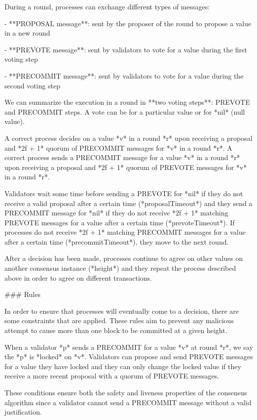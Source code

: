 \documentclass[a4paper,11pt,oneside]{report}
\begin{document}
\begin{markdown}
During a round, processes can exchange different types of messages:
 
- **PROPOSAL message**: sent by the proposer of the round to propose a value in a new round

- **PREVOTE message**: sent by validators to vote for a value during the first voting step

- **PRECOMMIT message**: sent by validators to vote for a value during the second voting step
 
We can summarize the execution in a round in **two voting steps**: PREVOTE and PRECOMMIT steps. A vote can be for a particular value or for *nil* (null value).

A correct process decides on a value *v* in a round *r* upon receiving a proposal and *2f + 1* quorum of PRECOMMIT messages for *v* in a round *r*. 
A correct process sends a PRECOMMIT message for a value *v* in a round *r* upon receiving a proposal and *2f + 1* quorum of PREVOTE messages for *v* in a round *r*.

Validators wait some time before sending a PREVOTE for *nil* if they do not receive a valid proposal after a certain time (*proposalTimeout*) and they send a PRECOMMIT message for *nil* if they do not receive *2f + 1* matching PREVOTE messages for a value after a certain time (*prevoteTimeout*).
If processes do not receive *2f + 1* matching PRECOMMIT messages for a value after a certain time (*precommitTimeout*), they move to the next round.

After a decision has been made, processes continue to agree on other values on another consensus instance (*height*) and they repeat the process described above in order to agree on different transactions.

### Rules

In order to ensure that processes will eventually come to a decision, there are some constraints that are applied. These rules aim to prevent any malicious attempt to cause more than one block to be committed at a given height. 

When a validator *p* sends a PRECOMMIT for a value *v* at round *r*, we say the *p* is *locked* on *v*. Validators can propose and send PREVOTE messages for a value they have locked and they can only change the locked value if they receive a more recent proposal with a quorum of PREVOTE messages. 

These conditions ensure both the safety and liveness properties of the consensus algorithm since a validator cannot send a PRECOMMIT message without a valid justification.


\end{markdown}
\end{document}
